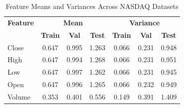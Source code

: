 \begin{table}[H]
    \centering
    \small
    \begin{tabular}{l|ccc|ccc}
        \toprule
        \textbf{Feature} & \multicolumn{3}{c|}{\textbf{Mean}} & \multicolumn{3}{c}{\textbf{Variance}} \\
        & \textbf{Train} & \textbf{Val} & \textbf{Test} & \textbf{Train} & \textbf{Val} & \textbf{Test} \\
        \midrule
        Close           & 0.647 & 0.995 & 1.263 & 0.066 & 0.231 & 0.948 \\
        High            & 0.647 & 0.994 & 1.268 & 0.066 & 0.231 & 0.951 \\
        Low             & 0.647 & 0.997 & 1.262 & 0.066 & 0.231 & 0.945 \\
        Open            & 0.647 & 0.996 & 1.265 & 0.066 & 0.232 & 0.949 \\
        Volume          & 0.353 & 0.401 & 0.556 & 0.149 & 0.391 & 1.409 \\
        \bottomrule
    \end{tabular}
    \caption{Feature Means and Variances Across NASDAQ Datasets}
    \label{tab:nasdaq_feature_stats}
\end{table}